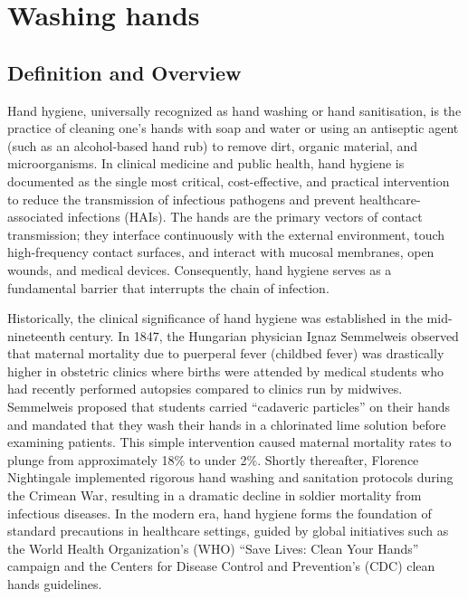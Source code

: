 \chapter{Washing hands}

\section*{Definition and Overview}
Hand hygiene, universally recognized as hand washing or hand sanitisation, is the practice of cleaning one's hands with soap and water or using an antiseptic agent (such as an alcohol-based hand rub) to remove dirt, organic material, and microorganisms. In clinical medicine and public health, hand hygiene is documented as the single most critical, cost-effective, and practical intervention to reduce the transmission of infectious pathogens and prevent healthcare-associated infections (HAIs). The hands are the primary vectors of contact transmission; they interface continuously with the external environment, touch high-frequency contact surfaces, and interact with mucosal membranes, open wounds, and medical devices. Consequently, hand hygiene serves as a fundamental barrier that interrupts the chain of infection.

Historically, the clinical significance of hand hygiene was established in the mid-nineteenth century. In 1847, the Hungarian physician Ignaz Semmelweis observed that maternal mortality due to puerperal fever (childbed fever) was drastically higher in obstetric clinics where births were attended by medical students who had recently performed autopsies compared to clinics run by midwives. Semmelweis proposed that students carried ``cadaveric particles'' on their hands and mandated that they wash their hands in a chlorinated lime solution before examining patients. This simple intervention caused maternal mortality rates to plunge from approximately 18\% to under 2\%. Shortly thereafter, Florence Nightingale implemented rigorous hand washing and sanitation protocols during the Crimean War, resulting in a dramatic decline in soldier mortality from infectious diseases. In the modern era, hand hygiene forms the foundation of standard precautions in healthcare settings, guided by global initiatives such as the World Health Organization's (WHO) ``Save Lives: Clean Your Hands'' campaign and the Centers for Disease Control and Prevention's (CDC) clean hands guidelines.

